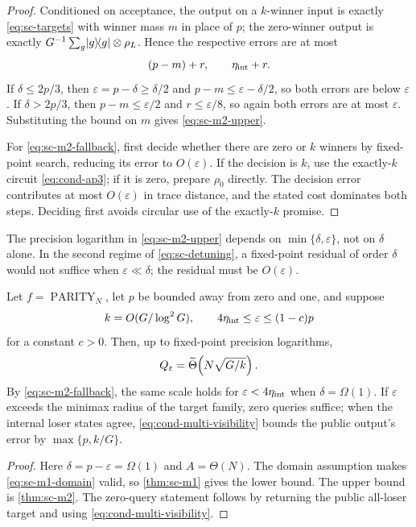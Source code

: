 \begin{proof}
Conditioned on acceptance, the output on a $k$-winner input is exactly
\eqref{eq:sc-targets} with winner mass $m$ in place of $p$; the zero-winner
output is exactly $G^{-1}\sum_g\lvert g\rangle\!\langle g\rvert\otimes\rho_L$.  Hence the
respective errors are at most
\[
 (p-m)+r,\qquad \eta_{\rm int}+r.
\]
If $\delta\le2p/3$, then $\varepsilon=p-\delta\ge\delta/2$ and
$p-m\le\varepsilon-\delta/2$, so both errors are below
$\varepsilon$.  If $\delta>2p/3$, then $p-m\le\varepsilon/2$ and
$r\le\varepsilon/8$, so again both errors are at most $\varepsilon$.  Substituting the bound on
$m$ gives \eqref{eq:sc-m2-upper}.

For \eqref{eq:sc-m2-fallback}, first decide whether there are zero or $k$
winners by fixed-point search, reducing its error to $O(\varepsilon)$.  If
the decision is $k$, use the exactly-$k$ circuit \eqref{eq:cond-ap3}; if it
is zero, prepare $\rho_0$ directly.  The decision error contributes at most
$O(\varepsilon)$ in trace distance, and the stated cost dominates both
steps.  Deciding first avoids circular use of the exactly-$k$ promise.
\end{proof}

The precision logarithm in \eqref{eq:sc-m2-upper} depends on
$\min\{\delta,\varepsilon\}$, not on $\delta$ alone.  In the second regime of \eqref{eq:sc-detuning}, a
fixed-point residual of order $\delta$ would not suffice when
$\varepsilon\ll\delta$; the residual must be $O(\varepsilon)$.

\begin{corollary}
\label{cor:sc-m3}
Let $f=\operatorname{PARITY}_N$, let $p$ be bounded away from zero and one,
and suppose
\[
 k=O(G/\log^2G),\qquad
 4\eta_{\rm int}\le\varepsilon\le(1-c)p
\]
for a constant $c>0$.  Then, up to fixed-point precision logarithms,
\[
 Q_\varepsilon=\widetilde{\Theta}\!\left(N\sqrt{G/k}\right).
\]
By \eqref{eq:sc-m2-fallback}, the same scale holds for
$\varepsilon<4\eta_{\rm int}$ when $\delta=\Omega(1)$.  If $\varepsilon$
exceeds the minimax radius of the target family, zero queries suffice; when
the internal loser states agree, \eqref{eq:cond-multi-visibility} bounds
the public output's error by $\max\{p,k/G\}$.
\end{corollary}

\begin{proof}
Here $\delta=p-\varepsilon=\Omega(1)$ and $A=\Theta(N)$.
The domain assumption makes \eqref{eq:sc-m1-domain} valid, so
\cref{thm:sc-m1} gives the lower bound.  The upper bound is
\cref{thm:sc-m2}.  The zero-query statement follows by returning the public
all-loser target and using \eqref{eq:cond-multi-visibility}.
\end{proof}

